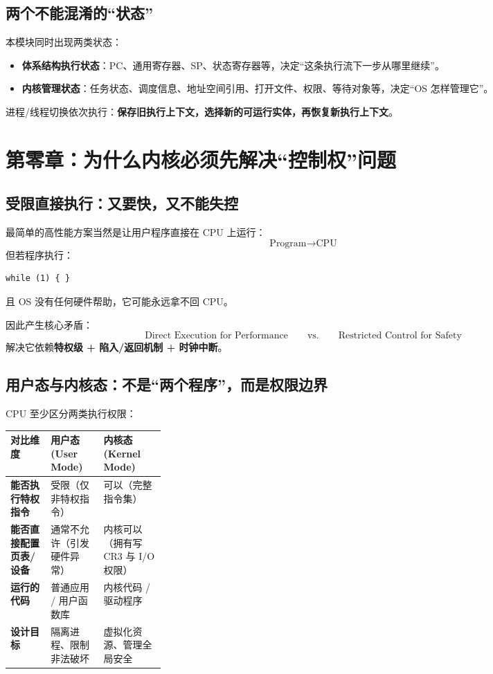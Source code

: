 \documentclass[11pt,a4paper]{ctexart}
\newcommand{\kw}[1]{\textbf{#1}}
\begin{document}
\subsection{两个不能混淆的“状态”}

本模块同时出现两类状态：

\begin{itemize}
  \item \kw{体系结构执行状态}：PC、通用寄存器、SP、状态寄存器等，决定“这条执行流下一步从哪里继续”。
  \item \kw{内核管理状态}：任务状态、调度信息、地址空间引用、打开文件、权限、等待对象等，决定“OS 怎样管理它”。
\end{itemize}

进程/线程切换依次执行：\kw{保存旧执行上下文，选择新的可运行实体，再恢复新执行上下文}。

\section{第零章：为什么内核必须先解决“控制权”问题}

\subsection{受限直接执行：又要快，又不能失控}

最简单的高性能方案当然是让用户程序直接在 CPU 上运行：
\[
\text{Program}\rightarrow\text{CPU}
\]
但若程序执行：
\begin{verbatim}
while (1) { }
\end{verbatim}
且 OS 没有任何硬件帮助，它可能永远拿不回 CPU。

因此产生核心矛盾：
\[
\boxed{\text{Direct Execution for Performance}}
\qquad\text{vs.}\qquad
\boxed{\text{Restricted Control for Safety}}
\]
解决它依赖\kw{特权级 + 陷入/返回机制 + 时钟中断}。

\subsection{用户态与内核态：不是“两个程序”，而是权限边界}

CPU 至少区分两类执行权限：

\begingroup
\small
\renewcommand{\arraystretch}{1.25}
\setlength{\tabcolsep}{6pt}
\begin{tabularx}{\linewidth}{>{\bfseries}p{0.26\linewidth} X X}
\toprule
对比维度 & 用户态 (User Mode) & 内核态 (Kernel Mode)\\
\midrule
能否执行特权指令 & 受限（仅非特权指令） & 可以（完整指令集）\\
能否直接配置页表/设备 & 通常不允许（引发硬件异常） & 内核可以（拥有写 CR3 与 I/O 权限）\\
运行的代码 & 普通应用 / 用户函数库 & 内核代码 / 驱动程序\\
设计目标 & 隔离进程、限制非法破坏 & 虚拟化资源、管理全局安全\\
\bottomrule
\end{tabularx}
\endgroup
\end{document}
